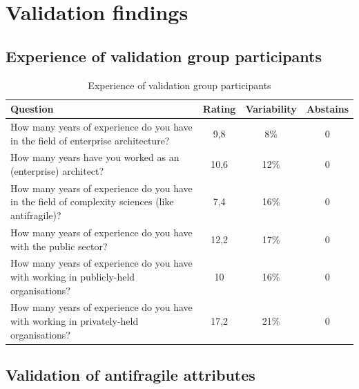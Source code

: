 \chapter{Validation findings}

\section{Experience of validation group participants}

\begin{table}[!h]
	\centering
	\begin{tabular}{p{}ccc}
		\toprule
		\textbf{Question} & \textbf{Rating} & \textbf{Variability} & \textbf{Abstains} \\
		\midrule
		How many years of experience do you have in the field of enterprise architecture? & 9,8 & 8\% & 0 \\%
		How many years have you worked as an (enterprise) architect? & 10,6 & 12\% & 0 \\%
		How many years of experience do you have in the field of complexity sciences (like antifragile)? & 7,4 & 16\% & 0 \\%
		How many years of experience do you have with the public sector? & 12,2 & 17\% & 0 \\%
		How many years of experience do you have with working in publicly-held organisations? & 10 & 16\% & 0 \\%
		How many years of experience do you have with working in privately-held organisations? & 17,2 & 21\% & 0 \\%
		\bottomrule
	\end{tabular}%
	\caption{Experience of validation group participants}
	\label{tab:appexperiencevalidationgroup}%
\end{table}%
\newpage
\section{Validation of antifragile attributes}


